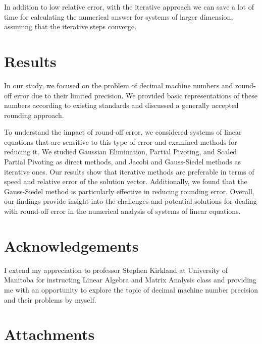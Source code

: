 \documentclass[letterpaper,12pt]{article}
\begin{document}
In addition to low relative error, with the iterative approach we can save a lot of time for calculating the numerical answer \cite{iterative, iterative2} for systems of larger dimension, assuming that the iterative steps converge.

\section{Results}
In our study, we focused on the problem of decimal machine numbers and round-off error due to their limited precision. We provided basic representations of these numbers according to existing standards and discussed a generally accepted rounding approach.

To understand the impact of round-off error, we considered systems of linear equations that are sensitive to this type of error and examined methods for reducing it. We studied Gaussian Elimination, Partial Pivoting, and Scaled Partial Pivoting as direct methods, and Jacobi and Gauss-Siedel methods as iterative ones. Our results show that iterative methods are preferable in terms of speed and relative error of the solution vector. Additionally, we found that the Gauss-Siedel method is particularly effective in reducing rounding error. Overall, our findings provide insight into the challenges and potential solutions for dealing with round-off error in the numerical analysis of systems of linear equations.

\section{Acknowledgements}
I extend my appreciation to professor Stephen Kirkland at University of Manitoba
for instructing Linear Algebra and Matrix Analysis class and providing me with an opportunity to explore
the topic of decimal machine number precision and their problems by myself.

\section{Attachments}
\end{document}
